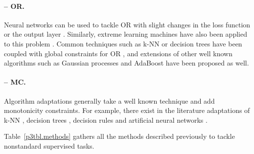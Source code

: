 \paragraph{-- OR.} Neural networks can be used to tackle OR with slight changes in the loss function or the output layer \cite{or-nn,or-nn2}. Similarly, extreme learning machines have also been applied to this problem \cite{or-elm,or-elm2}. Common techniques such as k-NN or decision trees have been coupled with global constraints for OR \cite{or-knn-dt}, and extensions of other well known algorithms such as Gaussian processes \cite{or-gp} and AdaBoost \cite{or-ada} have been proposed as well.

\paragraph{-- MC.} Algorithm adaptations generally take a well known technique and add monotonicity constraints. For example, there exist in the literature adaptations of k-NN \cite{mc-knn}, decision trees \cite{mc-trees}, decision rules \cite{mc-rules,mc-rules2} and artificial neural networks \cite{mc-monnets}.

\vspace{1em}

Table~\ref{p3tbl.methods} gathers all the methods described previously to tackle nonstandard supervised tasks.

